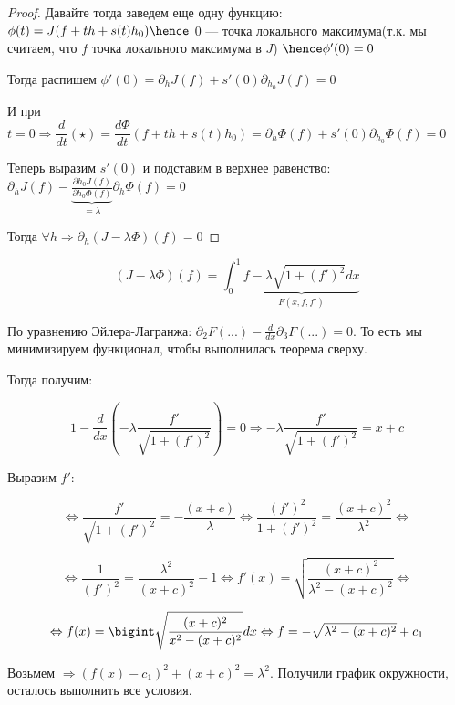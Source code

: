 \begin{example}
\begin{proof}
Давайте тогда заведем еще одну функцию: $\phi(t) = J(f + th + s(t)h_0) \hence$ 0 --- точка локального максимума(т.к. мы считаем, что $f$ точка локального максимума в $J$) $\hence \phi'(0) = 0$

Тогда распишем $\phi'(0) = \partial_h J(f) + s'(0) \partial _{h_0} J(f) = 0$

И при $t = 0 \Rightarrow \dfrac d {dt} (\star) = \dfrac {d\Phi} {dt} (f + th + s(t)h_0) = \partial_h \Phi(f) + s'(0) \partial_{h_0} \Phi(f) = 0$

Теперь выразим $s'(0)$ и подставим в верхнее равенство: $\partial_h J(f) - \underbrace{\frac{\partial h_0 J(f)}{\partial h_0 \Phi(f)}}_{= \lambda} \partial_h \Phi(f) = 0$

Тогда $\forall h \Rightarrow \partial_h (J - \lambda \Phi)(f) = 0$

\end{proof}

\[
    (J - \lambda \Phi)(f) = \int_0^1 \underbrace{f - \lambda \sqrt{1 + (f') ^ 2} dx}_{F(x, f, f')}
\]

По уравнению Эйлера-Лагранжа: $\partial_2 F (...) - \frac{d}{dx} \partial_3 F (...) = 0$. То есть мы минимизируем функционал, чтобы выполнилась теорема сверху.

Тогда получим:

\[
    1 - \frac{d}{dx} \left(-\lambda \frac{f'}{\sqrt{1 + (f')^2}}\right) = 0 \Rightarrow -\lambda \frac{f'}{\sqrt{1 + (f') ^ 2}} = x + c
\]

Выразим $f'$:

\[
    \Leftrightarrow \frac{f'}{\sqrt{1 + (f') ^ 2}} = -\frac{(x + c)}{\lambda} \Leftrightarrow \frac{(f') ^ 2}{1 + (f') ^ 2} = \frac{(x + c) ^ 2}{\lambda ^ 2} \Leftrightarrow
\]

\[
    \Leftrightarrow \frac{1}{(f') ^ 2} = \frac{\lambda ^ 2}{(x + c) ^ 2} - 1 \Leftrightarrow f'(x) = \sqrt{\frac{(x + c) ^ 2}{\lambda ^ 2 - (x + c) ^ 2}} \Leftrightarrow
\]

\[
    \Leftrightarrow f(x) = \bigint \sqrt{\frac{(x + c) ^ 2}{x ^ 2 - (x + c) ^ 2}} dx \Leftrightarrow f = -\sqrt{\lambda^2 - (x + c)^2} + c_1
\]

Возьмем $\Rightarrow (f(x) - c_1) ^ 2 + (x + c) ^ 2 = \lambda ^ 2$. Получили график окружности, осталось выполнить все условия.
\end{example}

